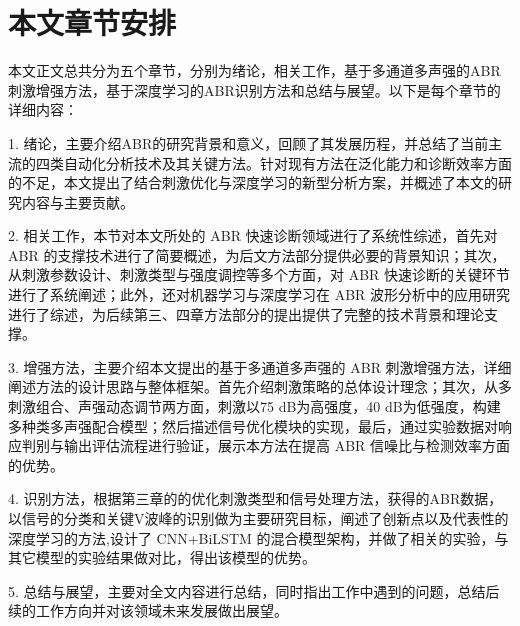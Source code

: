 \section{本文章节安排}
本文正文总共分为五个章节，分别为绪论，相关工作，基于多通道多声强的ABR刺激增强方法，基于深度学习的ABR识别方法和总结与展望。以下是每个章节的详细内容：

1. 绪论，主要介绍ABR的研究背景和意义，回顾了其发展历程，并总结了当前主流的四类自动化分析技术及其关键方法。针对现有方法在泛化能力和诊断效率方面的不足，本文提出了结合刺激优化与深度学习的新型分析方案，并概述了本文的研究内容与主要贡献。

2. 相关工作，本节对本文所处的 ABR 快速诊断领域进行了系统性综述，首先对 ABR 的支撑技术进行了简要概述，为后文方法部分提供必要的背景知识；其次，从刺激参数设计、刺激类型与强度调控等多个方面，对 ABR 快速诊断的关键环节进行了系统阐述；此外，还对机器学习与深度学习在 ABR 波形分析中的应用研究进行了综述，为后续第三、四章方法部分的提出提供了完整的技术背景和理论支撑。

3. 增强方法，主要介绍本文提出的基于多通道多声强的 ABR 刺激增强方法，详细阐述方法的设计思路与整体框架。首先介绍刺激策略的总体设计理念；其次，从多刺激组合、声强动态调节两方面，刺激以75 dB为高强度，40 dB为低强度，构建多种类多声强配合模型；然后描述信号优化模块的实现，最后，通过实验数据对响应判别与输出评估流程进行验证，展示本方法在提高 ABR 信噪比与检测效率方面的优势。

4. 识别方法，根据第三章的的优化刺激类型和信号处理方法，获得的ABR数据，以信号的分类和关键V波峰的识别做为主要研究目标，阐述了创新点以及代表性的深度学习的方法,设计了 CNN+BiLSTM 的混合模型架构，并做了相关的实验，与其它模型的实验结果做对比，得出该模型的优势。

5. 总结与展望，主要对全文内容进行总结，同时指出工作中遇到的问题，总结后续的工作方向并对该领域未来发展做出展望。